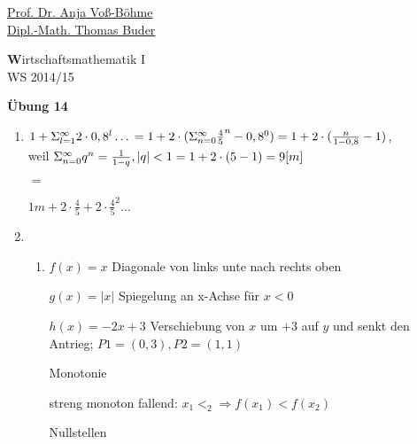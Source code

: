 \documentclass[12pt,a4paper]{scrreprt}
\begin{document}
 
\begin{flushleft}
\href{mailto:anja.voss-boehme@htw-dresden.de}{Prof. Dr. Anja Voß-Böhme} \\
\href{mailto:buder@htw-dresden.de}{Dipl.-Math. Thomas Buder}
\end{flushleft}

\begin{center}{\large\textbf Wirtschaftsmathematik I} \\ WS 2014/15 \end{center}

\begin{center}{\large\textbf{Übung 14}} 
\end{center}


\bigskip

\begin{enumerate}

\item

$1 + \Sigma_{l=1}^{\infty} 2 \cdot 0,8^l \ldots \\
 = 1 + 2 \cdot ( \Sigma_{n=0}^{\infty} \frac{4}{5}^n - 0,8^0 ) \\
= 1 + 2 \cdot ( \frac{n}{1-0,8} - 1 )$, \\
weil  $\Sigma_{n=0}^{\infty} q^n = \frac{1}{1-q}, |q| < 1 \\
= 1 + 2 \cdot ( 5 - 1 ) \\
= 9 [m]
$

$=
$

$
1m + 2 \cdot \frac{4}{5} + 2 \cdot \frac{4}{5}^2 \ldots
$



\item

\begin{enumerate}

\item


$f(x) = x$		Diagonale von links unte nach rechts oben


$g(x) = |x|$		Spiegelung an x-Achse für $x<0$

$h(x) = -2x + 3$	Verschiebung von $x$ um $+3$ auf $y$ und senkt den Antrieg; $P1=(0,3), P2=(1,1)$

Monotonie

streng monoton fallend: $x_1 < _2 \Rightarrow f(x_1) < f(x_2)$

Nullstellen


\end{enumerate}
\end{enumerate}
\end{document}
